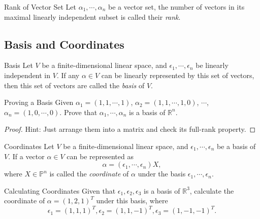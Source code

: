 \begin{definition}{Rank of Vector Set}{}
  Let $\alpha_1, \cdots, \alpha_n$ be a vector set,
  the number of vectors in its maximal linearly independent subset is called
  their \emph{rank}.
\end{definition}

\subsection{Basis and Coordinates}

\begin{definition}{Basis}{}
  Let $V$ be a finite-dimensional linear space,
  and $\epsilon_1, \cdots, \epsilon_n$ be linearly independent in $V$.
  If any $\alpha \in V$ can be linearly represented by this set of vectors,
  then this set of vectors are called the \emph{basis} of $V$.
\end{definition}

\begin{example}{Proving a Basis}{}
  Given $\alpha_1 = (1, 1, \cdots, 1)$,
  $\alpha_2 = (1, 1, \cdots, 1, 0)$,
  $\cdots$,
  $\alpha_n = (1, 0, \cdots, 0)$.
  Prove that $\alpha_1, \cdots, \alpha_n$ is a basis of $\mathbb{R}^n$.
\end{example}

\begin{proof}
  Hint: Just arrange them into a matrix and check its full-rank property.
\end{proof}

\begin{definition}{Coordinates}{}
  Let $V$ be a finite-dimensional linear space,
  and $\epsilon_1, \cdots, \epsilon_n$ be a basis of $V$.
  If a vector $\alpha \in V$ can be represented as
  \begin{equation}
    \alpha = (\epsilon_1, \cdots, \epsilon_n)X,
  \end{equation}
  where $X \in \mathbb{P}^n$ is called the \emph{coordinate} of $\alpha$
  under the basis $\epsilon_1,\cdots, \epsilon_n$.
\end{definition}

\begin{example}{Calculating Coordinates}{}
  Given that $\epsilon_{1}, \epsilon_2, \epsilon_3$ is a basis of
  $\mathbb{R}^3$,
  calculate the coordinate of $\alpha = (1, 2, 1)^T$ under this basis, where
  \begin{equation}
    \epsilon_1=(1,1,1)^T,\epsilon_2=(1,1,-1)^T,\epsilon_3=(1,-1,-1)^T.
    \end{equation}
\end{example}


